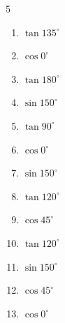 \begin{multicols}{5}
\begin{enumerate}
\resetques

  \item $\displaystyle \tan{135^\circ}$

        \phantom{$\displaystyle =-1$}

  \item $\displaystyle \cos{0^\circ}$

        \phantom{$\displaystyle =1$}

  \item $\displaystyle \tan{180^\circ}$

        \phantom{$\displaystyle =0$}

  \item $\displaystyle \sin{150^\circ}$


  \item $\displaystyle \tan{90^\circ}$

        \phantom{$\displaystyle なし$}

  \item $\displaystyle \cos{0^\circ}$

        \phantom{$\displaystyle =1$}

  \item $\displaystyle \sin{150^\circ}$


  \item $\displaystyle \tan{120^\circ}$


  \item $\displaystyle \cos{45^\circ}$


  \item $\displaystyle \tan{120^\circ}$


  \item $\displaystyle \sin{150^\circ}$


  \item $\displaystyle \cos{45^\circ}$


  \item $\displaystyle \cos{0^\circ}$


\end{enumerate}
\end{multicols}

